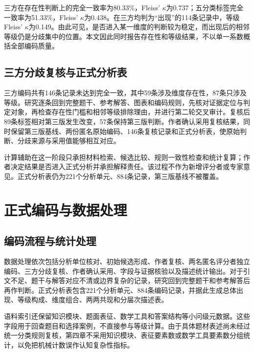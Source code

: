 \documentclass[
  12pt,
  a4paper,twoside,openany]{ctexbook}
\begin{document}
三方在存在性判断上的完全一致率为80.33\%，Fleiss'
\(\kappa\)为0.737；五分类标签完全一致率为51.33\%，Fleiss'
\(\kappa\)为0.438。在三方均判为``出现''的114条记录中，等级Fleiss'
\(\kappa\)为0.149。由此可见，是否进入某一维度的判断较为稳定，而出现后的相邻等级仍是分歧集中的位置。本文因此同时报告存在性和等级结果，不以单一系数概括全部编码质量。

\subsection{三方分歧复核与正式分析表}\label{ux4e09ux65b9ux5206ux6b67ux590dux6838ux4e0eux6b63ux5f0fux5206ux6790ux8868}

三方编码共有146条记录未达到完全一致，其中59条涉及维度存在性，87条只涉及等级。研究逐条回到完整题干、参考解答、图表和编码规则，先核对证据定位与判定对象，再检查存在性门槛和相邻等级排除理由，并进行第二轮交叉审计。复核后89条标签相对第三版发生改变，57条保持第三版判断。作者确认采用复核结果，同时保留第三版基线、两份匿名原始编码、146条复核记录和正式分析表，使原始判断、分歧来源与采用值能够相互对应。

计算辅助在这一阶段只承担材料检索、候选比较、规则一致性检查和统计复算；作者决定结果是否进入正式分析并承担解释责任。该过程不作为新增评分者或专家意见。正式分析表仍为221个分析单元、884条记录，第三版基线不被覆盖。

\section{正式编码与数据处理}\label{ux6b63ux5f0fux7f16ux7801ux4e0eux6570ux636eux5904ux7406}

\subsection{编码流程与统计处理}\label{ux7f16ux7801ux6d41ux7a0bux4e0eux7edfux8ba1ux5904ux7406}

数据处理依次包括分析单位核对、初始候选形成、作者复核、两名匿名评分者独立编码、三方分歧复核、作者确认采用、字段与证据核验以及描述统计输出。对于引文不足、题干与解答对应不清或边界复杂的记录，研究回到完整题干和参考解答后再作判断。正式分析表包含221个分析单元、884条编码记录，并据此生成总体出现、等级构成、维度组合、两两共现和分届次描述表。

语料索引还保留知识模块、题面表征、数学工具和答案结构等小问级元数据。这些字段用于回查题目和选择案例，不直接参与等级计算。由于具体题材表述尚未经过统一分类规则复核，第四章不采用知识模块、表征要素数或数学工具要素数分组统计，以免把机械计数误作认知复杂性指标。
\end{document}
